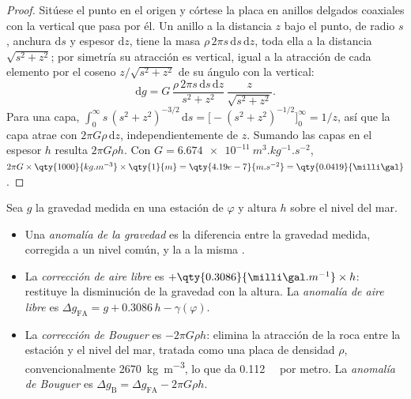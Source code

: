 \begin{proof}
Sitúese el punto en el origen y córtese la placa en anillos delgados coaxiales con la vertical que pasa por él. Un anillo a la
distancia $z$ bajo el punto, de radio
$s$, anchura $\mathrm ds$ y espesor $\mathrm dz$, tiene la masa
$\rho\,2\pi s\,\mathrm ds\,\mathrm dz$, toda ella a la distancia $\sqrt{s^2 + z^2}$;
por simetría su atracción es vertical, igual a la atracción de cada
elemento por el coseno $z/\sqrt{s^2+z^2}$ de su ángulo con la vertical:
\[
  \mathrm dg = G\,\frac{\rho\,2\pi s\,\mathrm ds\,\mathrm dz}{s^2 + z^2}\,
  \frac{z}{\sqrt{s^2 + z^2}} .
\]
Para una capa, $\int_0^\infty s\,(s^2 + z^2)^{-3/2}\,\mathrm ds =
\bigl[-(s^2 + z^2)^{-1/2}\bigr]_0^\infty = 1/z$, así que la capa atrae con
$2\pi G\rho\,\mathrm dz$, independientemente de $z$. Sumando las capas en el
espesor $h$ resulta $2\pi G\rho h$. Con $G = \qty{6.674e-11}{m^3.kg^{-1}.s^{-2}}$,
$2\pi G\times\qty{1000}{kg.m^{-3}}\times\qty{1}{m} = \qty{4.19e-7}{m.s^{-2}} =
\qty{0.0419}{\milli\gal}$.
\end{proof}

\begin{definition}\label{def:b1:isostasy-gravity:anomalies}
Sea $g$ la gravedad medida en una estación de  $\varphi$ y altura $h$ sobre el nivel del mar.
\begin{itemize}
  \item Una \emph{anomalía de la gravedad} es la diferencia entre la gravedad medida, corregida a un
        nivel común, y la  a la misma .
  \item La \emph{corrección de aire libre} es
        $+\qty{0.3086}{\milli\gal.m^{-1}}\times h$: restituye la disminución de la gravedad con la altura. La \emph{anomalía de
        aire libre} es
        $\Delta g_{\mathrm{FA}} = g + 0.3086\,h - \gamma(\varphi)$.
  \item La \emph{corrección de Bouguer} es $-2\pi G\rho h$: elimina la atracción de la roca entre la
        estación y el nivel del mar, tratada como una placa de densidad $\rho$, convencionalmente \qty{2670}{kg.m^{-3}}, lo que da
        \qty{0.112}{\milli\gal} por metro. La \emph{anomalía de Bouguer} es
        $\Delta g_{\mathrm B} = \Delta g_{\mathrm{FA}} - 2\pi G\rho h$.
\end{itemize}
\end{definition}

